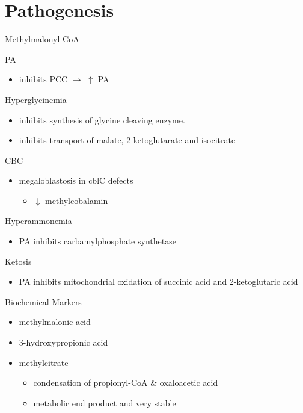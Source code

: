 \documentclass[presentation, smaller]{beamer}
\begin{document}
\section{Pathogenesis}
\label{sec:orgheadline11}


\begin{frame}[label={sec:orgheadline9}]{Methylmalonyl-CoA}
\begin{block}{PA}
\begin{itemize}
\item inhibits PCC \(\to\) \(\uparrow\) PA
\end{itemize}
\end{block}
\begin{block}{Hyperglycinemia}
\begin{itemize}
\item inhibits synthesis of glycine cleaving enzyme.
\item inhibits transport of malate, 2-ketoglutarate and isocitrate
\end{itemize}
\end{block}
\begin{block}{CBC}
\begin{itemize}
\item megaloblastosis in cblC defects
\begin{itemize}
\item \(\downarrow\) methylcobalamin
\end{itemize}
\end{itemize}
\end{block}

\begin{block}{Hyperammonemia}
\begin{itemize}
\item PA inhibits carbamylphosphate synthetase
\end{itemize}
\end{block}
\begin{block}{Ketosis}
\begin{itemize}
\item PA inhibits mitochondrial oxidation of succinic acid and 2-ketoglutaric acid
\end{itemize}
\end{block}
\end{frame}


\begin{frame}[label={sec:orgheadline10}]{Biochemical Markers}
\begin{itemize}
\item methylmalonic acid
\item 3-hydroxypropionic acid
\item methylcitrate
\begin{itemize}
\item condensation of propionyl-CoA \& oxaloacetic acid
\item metabolic end product and very stable
\end{itemize}
\end{itemize}
\end{frame}
\end{document}
